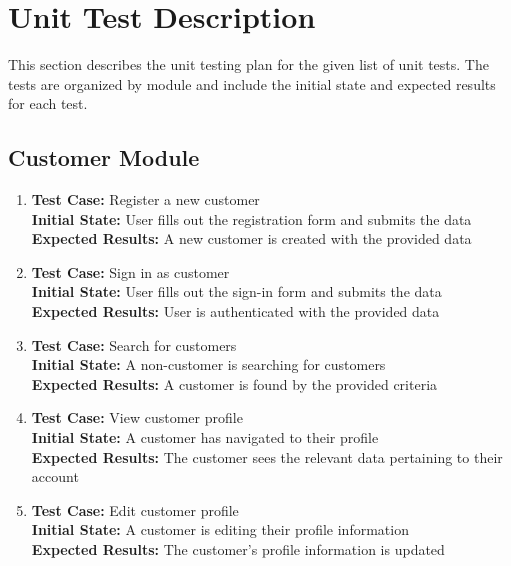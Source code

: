 \documentclass[12pt, titlepage]{article}
\begin{document}
\section{Unit Test Description}

This section describes the unit testing plan for the given list of unit tests. The tests are organized by module and include the initial state and expected results for each test.

\subsection{Customer Module}
\begin{enumerate}
    \item \textbf{Test Case:} Register a new customer \\
    \textbf{Initial State:} User fills out the registration form and submits the data \\
    \textbf{Expected Results:} A new customer is created with the provided data
    
    \item \textbf{Test Case:} Sign in as customer \\
    \textbf{Initial State:} User fills out the sign-in form and submits the data \\
    \textbf{Expected Results:} User is authenticated with the provided data
    
    \item \textbf{Test Case:} Search for customers \\
    \textbf{Initial State:} A non-customer is searching for customers \\
    \textbf{Expected Results:} A customer is found by the provided criteria
    
    \item \textbf{Test Case:} View customer profile \\
    \textbf{Initial State:} A customer has navigated to their profile \\
    \textbf{Expected Results:} The customer sees the relevant data pertaining to their account
    
    \item \textbf{Test Case:} Edit customer profile \\
    \textbf{Initial State:} A customer is editing their profile information \\
    \textbf{Expected Results:} The customer's profile information is updated
\end{enumerate}
\end{document}
